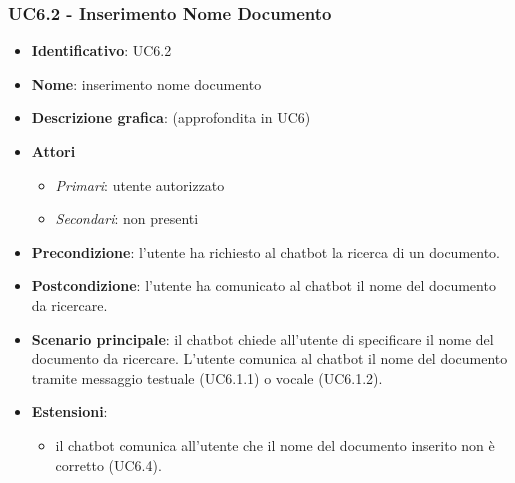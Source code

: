 \subsubsection{UC6.2 - Inserimento Nome Documento}
\begin{itemize}
    \item \textbf{Identificativo}: UC6.2
    \item \textbf{Nome}: inserimento nome documento
    \item \textbf{Descrizione grafica}: (approfondita in UC6)
    \item \textbf{Attori}
 \begin{itemize} 
    \item \textit{Primari}: utente autorizzato
    \item \textit{Secondari}: non presenti
 \end{itemize}
 \item \textbf{Precondizione}: l'utente ha richiesto al chatbot la ricerca di un documento.
 \item \textbf{Postcondizione}:  l'utente ha comunicato al chatbot il nome del documento da ricercare.
 \item \textbf{Scenario principale}: il chatbot chiede all'utente di specificare il nome del documento da ricercare. L'utente comunica al chatbot il nome del documento tramite messaggio testuale (UC6.1.1) o vocale (UC6.1.2).
 \item \textbf{Estensioni}: 
\begin{itemize} 
    \item il chatbot comunica all'utente che il nome del documento inserito non è corretto (UC6.4).
 \end{itemize}
\end{itemize}

